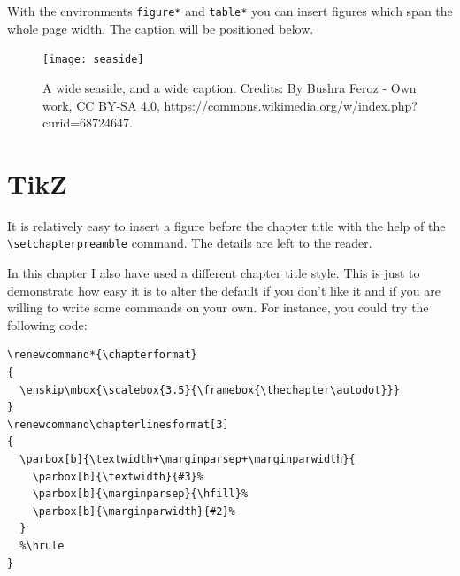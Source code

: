 With the environments \verb|figure*| and \verb|table*| you can insert 
figures which span the whole page width. The caption will be positioned 
below.

\begin{figure}[h!]
	\texttt{[image: seaside]}
	\vspace*{-1.3cm}
	\caption[A wide seaside]{A wide seaside, and a wide caption.
		Credits: By Bushra Feroz - Own work, CC BY-SA 4.0, 
		https://commons.wikimedia.org/w/index.php?curid=68724647.
		\blindtext}
\end{figure}

\section{TikZ}

It is relatively easy to insert a figure before the chapter title with 
the help of the \verb|\setchapterpreamble| command. The details are left 
to the reader.

In this chapter I also have used a different chapter title style. This 
is just to demonstrate how easy it is to alter the default if you don't 
like it and if you are willing to write some commands on your own. For 
instance, you could try the following code:

\begin{lstlisting}
\renewcommand*{\chapterformat}
{
  \enskip\mbox{\scalebox{3.5}{\framebox{\thechapter\autodot}}}
}
\renewcommand\chapterlinesformat[3]
{
  \parbox[b]{\textwidth+\marginparsep+\marginparwidth}{
	\parbox[b]{\textwidth}{#3}%
	\parbox[b]{\marginparsep}{\hfill}%
	\parbox[b]{\marginparwidth}{#2}%
  }
  %\hrule
}
\end{lstlisting}

